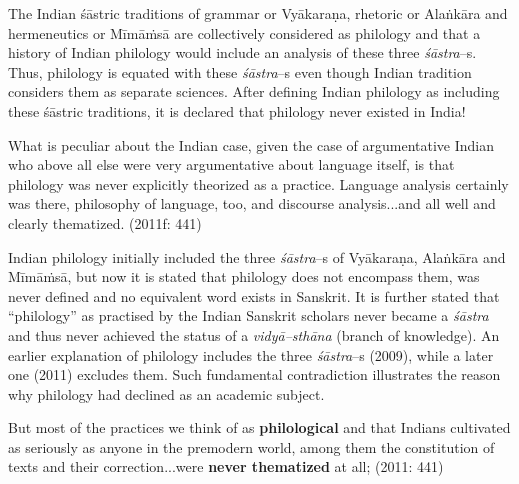 The Indian śāstric traditions of grammar or Vyākaraṇa, rhetoric or Alaṅkāra and hermeneutics or Mīmāṁsā are collectively considered as philology and that a history of Indian philology would include an analysis of these three\textit{ śāstra}–s. Thus, philology is equated with these \textit{śāstra}–s even though Indian tradition considers them as separate sciences. After defining Indian philology as including these śāstric traditions, it is declared that philology never existed in India!

\begin{myquote}
What is peculiar about the Indian case, given the case of argumentative Indian who above all else were very argumentative about language itself, is that philology was never explicitly theorized as a practice. Language analysis certainly was there, philosophy of language, too, and discourse analysis...and all well and clearly thematized. (2011f: 441)
\end{myquote}

Indian philology initially included the three \textit{śāstra}–s of Vyākaraṇa, Alaṅkāra and Mīmāṁsā, but now it is stated that philology does not encompass them, was never defined and no equivalent word exists in Sanskrit. It is further stated that “philology” as practised by the Indian Sanskrit scholars never became a \textit{śāstra} and thus never achieved the status of a \textit{vidyā–sthāna} (branch of knowledge). An earlier explanation of philology includes the three \textit{śāstra}–s (2009), while a later one (2011) excludes them. Such fundamental contradiction illustrates the reason why philology had declined as an academic subject.


\begin{myquote}
But most of the practices we think of as \textbf{philological} and that Indians cultivated as seriously as anyone in the premodern world, among them the constitution of texts and their correction...were \textbf{never thematized} at all; (2011: 441)
\end{myquote}

